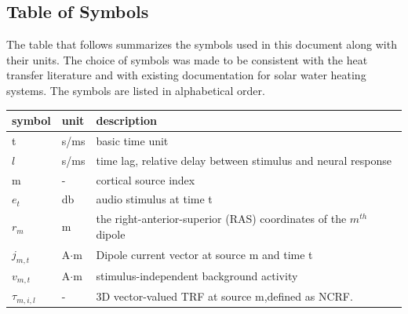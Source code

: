 \documentclass[12pt]{article}
\begin{document}



\subsection{Table of Symbols}

The table that follows summarizes the symbols used in this document along with
their units.  The choice of symbols was made to be consistent with the heat
transfer literature and with existing documentation for solar water heating
systems.  The symbols are listed in alphabetical order.

\renewcommand{\arraystretch}{1.2}
\noindent
\begin{longtable}{l l p{12cm}} \toprule
  \textbf{symbol} & \textbf{unit} & \textbf{description}\\
  \midrule
  t & s/ms & basic time unit \\
  $l$ & s/ms & time lag, relative delay between stimulus and neural response\\
  m & - & cortical source index \\
  $e_t$ & db & audio stimulus at time t \\
  $r_m$ & m &  the right-anterior-superior (RAS) coordinates of the $m^{th}$ dipole \\
  $j_{m,t}$ & A$\cdot$m & Dipole current vector at source m and time t\\
  $v_{m,t}$ & A$\cdot$m & stimulus-independent background activity \\
  $\tau_{m,i,l}$ & - & 3D vector-valued TRF at source m,defined as NCRF.\\
  \bottomrule
\end{longtable}
\end{document}

